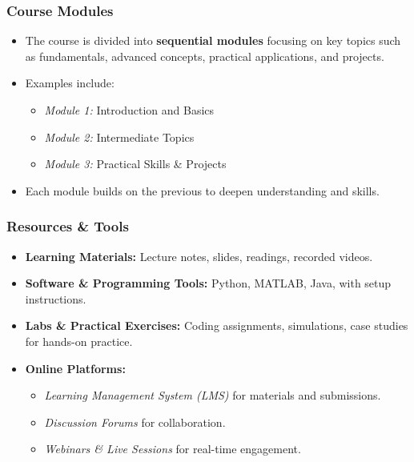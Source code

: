 \documentclass{beamer}
\begin{document}
\begin{frame}[fragile]
    \frametitle{Course Modules}
    \begin{itemize}
        \item The course is divided into \textbf{sequential modules} focusing on key topics such as fundamentals, advanced concepts, practical applications, and projects.
        \item Examples include:
        \begin{itemize}
            \item \textit{Module 1:} Introduction and Basics
            \item \textit{Module 2:} Intermediate Topics
            \item \textit{Module 3:} Practical Skills \& Projects
        \end{itemize}
        \item Each module builds on the previous to deepen understanding and skills.
    \end{itemize}
\end{frame}

\begin{frame}[fragile]
    \frametitle{Resources \& Tools}
    \begin{itemize}
        \item \textbf{Learning Materials:} Lecture notes, slides, readings, recorded videos.
        \item \textbf{Software \& Programming Tools:} Python, MATLAB, Java, with setup instructions.
        \item \textbf{Labs \& Practical Exercises:} Coding assignments, simulations, case studies for hands-on practice.
        \item \textbf{Online Platforms:} \\
        \begin{itemize}
            \item \textit{Learning Management System (LMS)} for materials and submissions.
            \item \textit{Discussion Forums} for collaboration.
            \item \textit{Webinars \& Live Sessions} for real-time engagement.
        \end{itemize}
    \end{itemize}
\end{frame}
\end{document}
